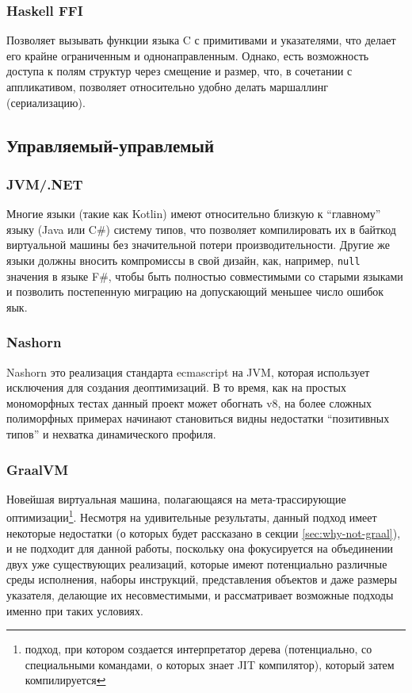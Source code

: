 \documentclass[times,specification,annotation]{itmo-student-thesis}
\begin{document}
\subsubsection{Haskell FFI}
Позволяет вызывать функции языка C с примитивами и указателями, что делает его крайне ограниченным и однонаправленным. Однако, есть возможность доступа к полям структур через смещение и размер, что, в сочетании с аппликативом, позволяет относительно удобно делать маршаллинг (сериализацию).

\subsection{Управляемый-управлемый}
\subsubsection{JVM/.NET}
Многие языки (такие как Kotlin) имеют относительно близкую к ``главному'' языку (Java или C\#) систему типов, что позволяет компилировать их в байткод виртуальной машины без значительной потери производительности. Другие же языки должны вносить компромиссы в свой дизайн, как, например, \texttt{null} значения в языке F\#, чтобы быть полностью совместимыми со старыми языками и позволить постепенную миграцию на допускающий меньшее число ошибок яык.
\subsubsection{Nashorn}
Nashorn это реализация стандарта ecmascript на JVM, которая использует исключения для создания деоптимизаций. В то время, как на простых мономорфных тестах данный проект может обогнать v8, на более сложных полиморфных примерах начинают становиться видны недостатки ``позитивных типов'' и нехватка динамического профиля.

\subsubsection{GraalVM}
Новейшая виртуальная машина, полагающаяся на мета-трассирующие оптимизации\footnote{подход, при котором создается интерпретатор дерева (потенциально, со специальными командами, о которых знает JIT компилятор), который затем компилируется}. Несмотря на удивительные результаты, данный подход имеет некоторые недостатки (о которых будет рассказано в секции \ref{sec:why-not-graal}), и не подходит для данной работы, поскольку она фокусируется на объединении двух уже существующих реализаций, которые имеют потенциально различные среды исполнения, наборы инструкций, представления объектов и даже размеры указателя, делающие их несовместимыми, и рассматривает возможные подходы именно при таких условиях.
\end{document}
